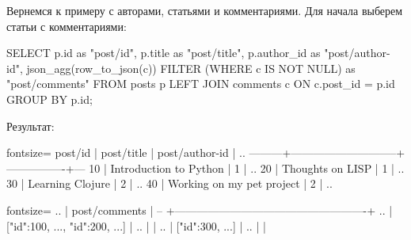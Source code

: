 Вернемся к примеру с авторами, статьями и комментариями. Для начала выберем статьи с комментариями:


\begin{english}
  \begin{sql/lines}
SELECT
  p.id        as "post/id",
  p.title     as "post/title",
  p.author_id as "post/author-id",
  json_agg(row_to_json(c)) FILTER
          (WHERE c IS NOT NULL) as "post/comments"
FROM posts p
LEFT JOIN comments c ON c.post_id = p.id
GROUP BY p.id;
  \end{sql/lines}
\end{english}

Результат:

\begin{english}
  \begin{text*}{fontsize=\small}
 post/id |         post/title          | post/author-id | ..
---------+-----------------------------+----------------+---
      10 | Introduction to Python      |              1 | ..
      20 | Thoughts on LISP            |              1 | ..
      30 | Learning Clojure            |              2 | ..
      40 | Working on my pet project   |              2 | ..
  \end{text*}
\end{english}


\begin{english}
  \begin{text*}{fontsize=\small}
.. |                    post/comments                   |
-- +----------------------------------------------------+
.. | [{"id":100, ...}, {"id":200, ...}]                 |
.. |                                                    |
.. | [{"id":300, ...}]                                  |
.. |                                                    |
  \end{text*}
\end{english}



